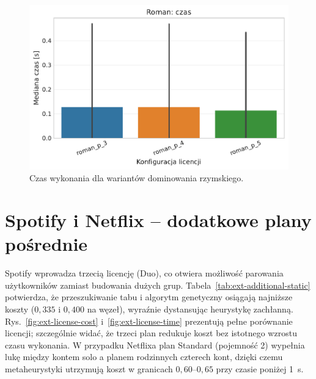 \begin{figure}[H]
  \centering
  \includegraphics[width=0.6\linewidth]{assets/figures/extensions/static/roman_time_comparison.pdf}
  \caption{Czas wykonania dla wariantów dominowania rzymskiego.}
  \label{fig:ext-roman-time}
\end{figure}

\section{Spotify i Netflix -- dodatkowe plany pośrednie}

Spotify wprowadza trzecią licencję (Duo), co otwiera możliwość parowania użytkowników zamiast budowania dużych grup. Tabela~\ref{tab:ext-additional-static} potwierdza, że przeszukiwanie tabu i algorytm genetyczny osiągają najniższe koszty ($0{,}335$ i $0{,}400$ na węzeł), wyraźnie dystansując heurystykę zachłanną. Rys.~\ref{fig:ext-license-cost} i~\ref{fig:ext-license-time} prezentują pełne porównanie licencji; szczególnie widać, że trzeci plan redukuje koszt bez istotnego wzrostu czasu wykonania. W przypadku Netflixa plan Standard (pojemność 2) wypełnia lukę między kontem solo a planem rodzinnych czterech kont, dzięki czemu metaheurystyki utrzymują koszt w granicach $0{,}60$–$0{,}65$ przy czasie poniżej 1~s.

